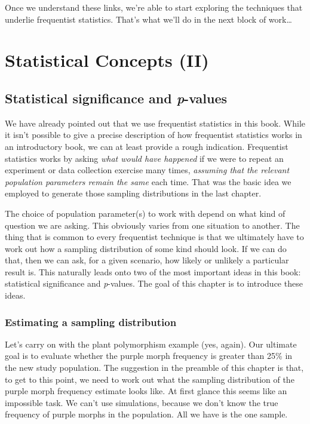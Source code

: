 \documentclass[]{book}
\begin{document}
Once we understand these links, we're able to start exploring the
techniques that underlie frequentist statistics. That's what we'll do in
the next block of work\ldots{}

\part{Statistical Concepts
(II)}\label{part-statistical-concepts-ii}

\chapter{\texorpdfstring{Statistical significance and
\emph{p}-values}{Statistical significance and p-values}}\label{statistical-significance-and-p-values}

We have already pointed out that we use frequentist statistics in this
book. While it isn't possible to give a precise description of how
frequentist statistics works in an introductory book, we can at least
provide a rough indication. Frequentist statistics works by asking
\emph{what would have happened} if we were to repeat an experiment or
data collection exercise many times, \emph{assuming that the relevant
population parameters remain the same} each time. That was the basic
idea we employed to generate those sampling distributions in the last
chapter.

The choice of population parameter(s) to work with depend on what kind
of question we are asking. This obviously varies from one situation to
another. The thing that is common to every frequentist technique is that
we ultimately have to work out how a sampling distribution of some kind
should look. If we can do that, then we can ask, for a given scenario,
how likely or unlikely a particular result is. This naturally leads onto
two of the most important ideas in this book: statistical significance
and \emph{p}-values. The goal of this chapter is to introduce these
ideas.

\section{Estimating a sampling distribution}\label{bootstrap}

Let's carry on with the plant polymorphism example (yes, again). Our
ultimate goal is to evaluate whether the purple morph frequency is
greater than 25\% in the new study population. The suggestion in the
preamble of this chapter is that, to get to this point, we need to work
out what the sampling distribution of the purple morph frequency
estimate looks like. At first glance this seems like an impossible task.
We can't use simulations, because we don't know the true frequency of
purple morphs in the population. All we have is the one sample.
\end{document}
